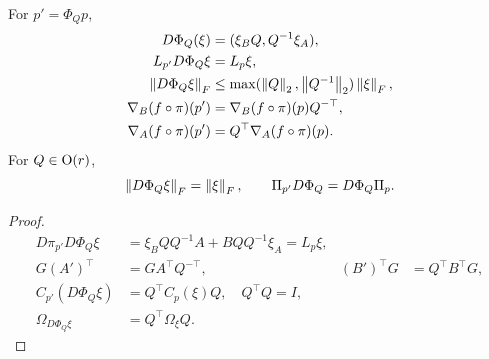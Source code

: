 \begin{proposition}
\label{prop:transport}
For $p'=\Phi_Qp$,
\begin{align}
D\Phi_Q(\xi)&=(\xi_BQ,Q^{-1}\xi_A),\\
L_{p'}D\Phi_Q\xi&=L_p\xi,\\
\left\lVert D\Phi_Q\xi\right\rVert_F&\leq\max(\left\lVert Q\right\rVert_2,\left\lVert Q^{-1}\right\rVert_2)\left\lVert\xi\right\rVert_F,\\
\nabla_B(f\circ\pi)(p')&=\nabla_B(f\circ\pi)(p)Q^{-\top},\\
\nabla_A(f\circ\pi)(p')&=Q^\top\nabla_A(f\circ\pi)(p).
\label{eq:rigid-vector-covector}
\end{align}
For $Q\in{\rm O}(r)$,
\begin{equation}
\left\lVert D\Phi_Q\xi\right\rVert_F=\left\lVert\xi\right\rVert_F,\qquad
\Pi_{p'}D\Phi_Q=D\Phi_Q\Pi_p .
\end{equation}
\end{proposition}
\begin{proof}
\begin{align}
D\pi_{p'}D\Phi_Q\xi
&=\xi_BQQ^{-1}A+BQQ^{-1}\xi_A=L_p\xi,\\
G(A')^\top&=GA^\top Q^{-\top},&
(B')^\top G&=Q^\top B^\top G,\\
C_{p'}(D\Phi_Q\xi)&=Q^\top C_p(\xi)Q,\quad Q^\top Q=I,\\
\Omega_{D\Phi_Q\xi}&=Q^\top\Omega_\xi Q .
\end{align}
\end{proof}

